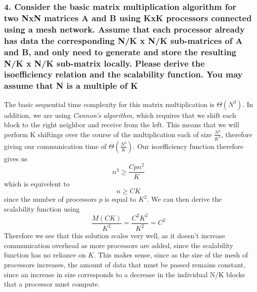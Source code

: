 \documentclass[titlepage]{article}
\begin{document}
\subsubsection*{4. Consider the basic matrix multiplication algorithm for two
NxN matrices A and B using KxK processors connected using a mesh network. 
Assume that each processor already has data the corresponding N/K x N/K 
sub-matrices of A and B, and only need to generate and store the resulting N/K
x N/K sub-matrix locally. Please derive the isoefficiency relation and the
scalability function. You may assume that N is a multiple of K}
The basic sequential time complexity for this matrix multiplication is 
$\Theta(N^3)$. In addition, we are using \textit{Cannon's algorithm}, which
requires that we shift each block to the right neighbor and receive from the
left. This means that we will perform K shiftings over the course of the
multiplication each of size $\frac{N^2}{K^2}$, therefore giving our
communication time of $\Theta(\frac{N^2}{K})$. Our isoefficiency function
therefore gives us
\begin{equation}
    n^3 \geq \frac{Cpn^2}{K}
\end{equation}
which is equivelent to
\begin{equation}
    n \geq CK
\end{equation}
since the number of processors $p$ is equal to $K^2$.
We can then derive the scalability function using
\begin{equation}
    \frac{M(CK)}{K^2} = \frac{C^2K^2}{K^2} = C^2
\end{equation}
Therefore we see that this solution scales very well, as it doesn't increase
communication overhead as more processors are added, since the scalability
function has no reliance on $K$. This makes sense, since as the size of the
mesh of processors increases, the amount of data that must be passed remains
constant, since an increase in size corresponds to a decrease in the individual
N/K blocks that a processor must compute.
\end{document}
